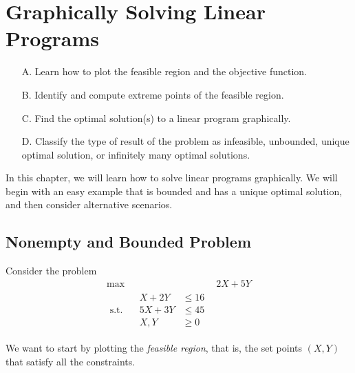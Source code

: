 \chapter{Graphically Solving Linear Programs}
\begin{outcome}

\begin{enumerate}
\item[A.] Learn how to plot the feasible region and the objective function.
\item[B.] Identify and compute extreme points of the feasible region.
\item[C.] Find the optimal solution(s) to a linear program graphically.
\item[D.] Classify the type of result of the problem as infeasible, unbounded, unique optimal solution, or infinitely many optimal solutions.
\end{enumerate}
\end{outcome}
In this chapter, we will learn how to solve linear programs graphically.  We will begin with an easy example that is bounded and has a unique optimal solution, and then consider alternative scenarios.

\section{Nonempty and Bounded Problem}
Consider the problem
$$
\begin{array}{rl}
\max \quad & 2 X+5 Y \\
\text { s.t. } \quad \begin{aligned}
X+2 Y & \leq 16 \\
5 X+3 Y &\leq  45 \\
X, Y & \geq 0
\end{aligned}
\end{array}
$$

We want to start by plotting the \emph{feasible region}, that is, the set points $(X,Y)$ that satisfy all the constraints. 

